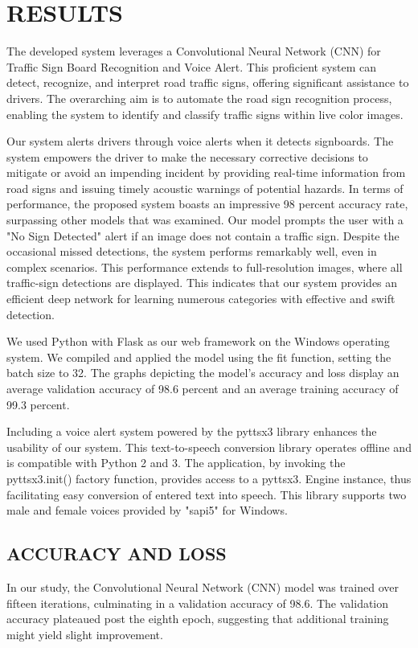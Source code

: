 \documentclass[conference]{IEEEtran}
\begin{document}
\section{RESULTS}
The developed system leverages a Convolutional Neural Network (CNN) for Traffic Sign Board Recognition and Voice Alert. This proficient system can detect, recognize, and interpret road traffic signs, offering significant assistance to drivers. The overarching aim is to automate the road sign recognition process, enabling the system to identify and classify traffic signs within live color images.

Our system alerts drivers through voice alerts when it detects signboards. The system empowers the driver to make the necessary corrective decisions to mitigate or avoid an impending incident by providing real-time information from road signs and issuing timely acoustic warnings of potential hazards.
In terms of performance, the proposed system boasts an impressive 98 percent accuracy rate, surpassing other models that was examined. Our model prompts the user with a "No Sign Detected" alert if an image does not contain a traffic sign. Despite the occasional missed detections, the system performs remarkably well, even in complex scenarios. This performance extends to full-resolution images, where all traffic-sign detections are displayed. This indicates that our system provides an efficient deep network for learning numerous categories with effective and swift detection.

We used Python with Flask as our web framework on the Windows operating system. We compiled and applied the model using the fit function, setting the batch size to 32. The graphs depicting the model's accuracy and loss display an average validation accuracy of 98.6 percent and an average training accuracy of 99.3 percent.

Including a voice alert system powered by the pyttsx3 library enhances the usability of our system. This text-to-speech conversion library operates offline and is compatible with Python 2 and 3. The application, by invoking the pyttsx3.init() factory function, provides access to a pyttsx3. Engine instance, thus facilitating easy conversion of entered text into speech. This library supports two male and female voices provided by "sapi5" for Windows.

\subsection{ACCURACY AND LOSS}
In our study, the Convolutional Neural Network (CNN) model was trained over fifteen iterations, culminating in a validation accuracy of 98.6. The validation accuracy plateaued post the eighth epoch, suggesting that additional training might yield slight improvement.
\end{document}
